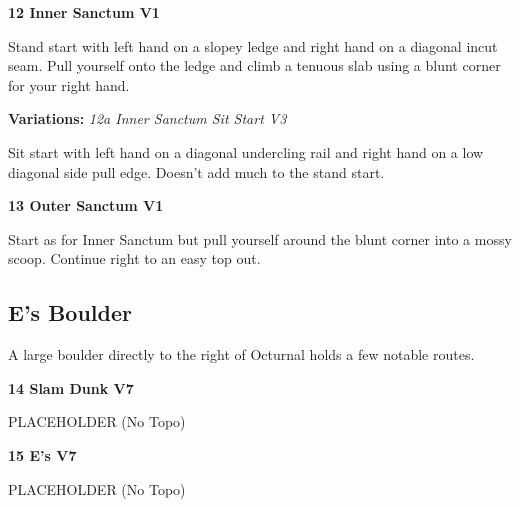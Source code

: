 \begin{multicols*}{2}
					\label{rt:Inner Sanctum}\colorbox{green!20}{\textbf{12 Inner Sanctum V1 \ding{72}   \warn }}
					\begin{adjustwidth}{0.5cm}{}
					\begin{minipage}{\linewidth}					
					Stand start with left hand on a slopey ledge and right hand on a diagonal incut seam. Pull yourself onto the ledge and climb a tenuous slab using a blunt corner for your right hand.
					\end{minipage}
						\newline \textbf{Variations:} \newline
							\label{vr:Inner Sanctum Sit Start}\colorbox{green!20}{\emph{12a Inner Sanctum Sit Start V3   }}
							\begin{adjustwidth}{0.5cm}{}
							\begin{minipage}{\linewidth}					
							Sit start with left hand on a diagonal undercling rail and right hand on a low diagonal side pull edge. Doesn't add much to the stand start.
							\end{minipage}
							\end{adjustwidth}
					\end{adjustwidth}
					\label{rt:Outer Sanctum}\colorbox{green!20}{\textbf{13 Outer Sanctum V1 \ding{72}  }}
					\begin{adjustwidth}{0.5cm}{}
					\begin{minipage}{\linewidth}					
					Start as for Inner Sanctum but pull yourself around the blunt corner into a mossy scoop. Continue right to an easy top out.
					\end{minipage}
					\end{adjustwidth}
			\subsection*{E's Boulder}\label{bf:E's Boulder}
			\begin{minipage}{\columnwidth}
			A large boulder directly to the right of Octurnal holds a few notable routes.
			\end{minipage}
			
					\label{rt:Slam Dunk}\colorbox{Goldenrod!50}{\textbf{14 Slam Dunk V7  }}
					\begin{adjustwidth}{0.5cm}{}
					\begin{minipage}{\linewidth}					
					PLACEHOLDER
						\newline (No Topo) 
					\end{minipage}
					\end{adjustwidth}
					\label{rt:E's}\colorbox{Goldenrod!50}{\textbf{15 E's V7  }}
					\begin{adjustwidth}{0.5cm}{}
					\begin{minipage}{\linewidth}					
					PLACEHOLDER
						\newline (No Topo) 
					\end{minipage}
					\end{adjustwidth}


\end{multicols*}
